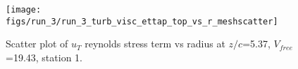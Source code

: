 \begin{figure}[H]
\centering
\texttt{[image: figs/run\_3/run\_3\_turb\_visc\_ettap\_top\_vs\_r\_meshscatter]}
\caption{Scatter plot of $
u_T$ reynolds stress term vs radius at $z/c$=5.37, $V_{free}$=19.43, station 1.}
\label{fig:run_3_turb_visc_ettap_top_vs_r_meshscatter}
\end{figure}


